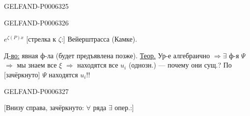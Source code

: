 \begin{GelfandAdjacentEvidence}{GELFAND-P000632}{5}

\end{GelfandAdjacentEvidence}
\begin{GelfandAdjacentEvidence}{GELFAND-P000632}{6}

\(e^{\zeta(P)x}\) [стрелка к \(\zeta\):] Вейерштрасса (Камке).

\underline{Д-во:} явная ф-ла (будет предъявлена позже).
\underline{Теор.} Ур-е алгебраично \(\Rightarrow\exists\) ф-я \(\Psi\)
\(\Rightarrow\) мы знаем все \(\xi\)
\(\Rightarrow\) находятся все \(u_i\) (однозн.) --- почему они сущ.?
По [зачёркнуто] \(\Psi\) находятся \(u_i\)!!
\end{GelfandAdjacentEvidence}
\begin{GelfandAdjacentEvidence}{GELFAND-P000632}{7}

[Внизу справа, зачёркнуто: \(\forall\) ряда \(\exists\) опер.:]
\end{GelfandAdjacentEvidence}



